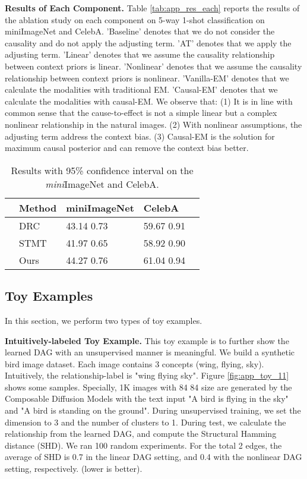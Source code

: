 \documentclass[letterpaper]{article} \usepackage{aaai23}  \usepackage{times}  \usepackage{helvet}  \usepackage{courier}  \usepackage[hyphens]{url}  \usepackage{graphicx} \urlstyle{rm} \def\UrlFont{\rm}  \usepackage{natbib}  \usepackage{caption} \frenchspacing  \setlength{\pdfpagewidth}{8.5in}  \setlength{\pdfpageheight}{11in}  \usepackage{algorithm}
\theoremstyle{plain}
\theoremstyle{definition}
\theoremstyle{remark}
\begin{document}
\textbf{Results of Each Component.}
Table \ref{tab:app_res_each} reports  the results of the ablation study on each component on 5-way 1-shot classification on miniImageNet and CelebA. 'Baseline' denotes that we do not consider the causality and do not apply the adjusting term. 'AT' denotes that we apply the adjusting term. 'Linear' denotes that we assume the causality relationship between context priors is linear. 'Nonlinear' denotes that we assume the causality relationship between context priors is nonlinear. 'Vanilla-EM' denotes that we calculate the modalities with traditional EM. 'Causal-EM' denotes that we calculate the modalities with causal-EM. We observe that: (1) It is in line with common sense that the cause-to-effect is not a simple linear but a complex nonlinear relationship in the natural images. (2) With nonlinear assumptions, the adjusting term address the context bias. (3) Causal-EM is the solution for maximum causal posterior and can remove the context bias better.



\begin{table}[]
	\centering
	\caption{Results with 95\% confidence interval on the \textit{mini}ImageNet and CelebA.}  
	\label{tab:app_res_other}
	\begin{tabular}{lllll}
		\toprule
		& Method          & miniImageNet     & CelebA           &  \\\midrule
		& DRC  & 43.14  0.73 & 59.67  0.91 &  \\
		& STMT & 41.97  0.65 & 58.92  0.90 &  \\
		& Ours            & 44.27  0.76 & 61.04  0.94 &  \\ \bottomrule
	\end{tabular}
\end{table}

\subsection{Toy Examples}
In this section, we perform two types of toy examples.

\textbf{Intuitively-labeled Toy Example.} This toy example is to further show the learned DAG with an unsupervised manner is meaningful. We build a synthetic bird image dataset. Each image contains 3 concepts (wing, flying, sky). Intuitively, the relationship-label  is "wing  flying  sky". Figure \ref{fig:app_toy_11} shows some samples. Specially, 1K images with 84  84 size are generated by the Composable Diffusion Models \cite{liu2022compositional} with the text input "A bird is flying in the sky" and "A bird is standing on the ground". During unsupervised training, we set the dimension to 3 and the number of clusters to 1. During test, we calculate the relationship  from the learned DAG, and compute the Structural Hamming distance (SHD). We ran 100 random experiments. For the total 2 edges, the average of SHD is 0.7 in the linear DAG setting, and 0.4 with the nonlinear DAG setting, respectively. (lower is better).  
\end{document}
